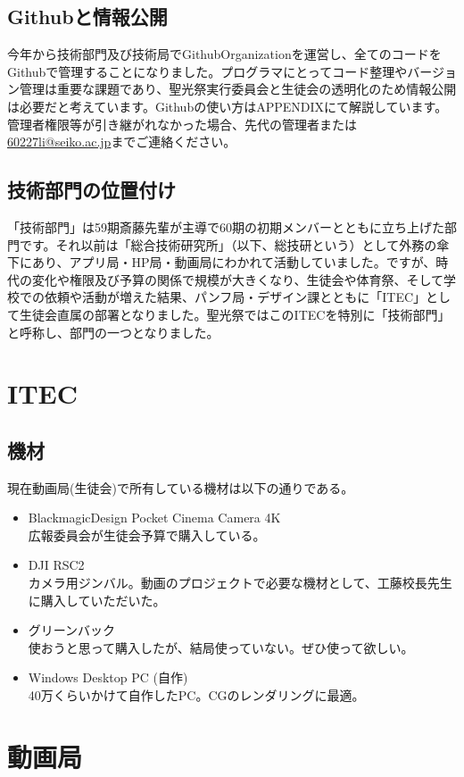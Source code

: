 \documentclass[dvipdfmx,jb5]{jarticle}
\begin{document}
\subsection{Githubと情報公開}
今年から技術部門及び技術局でGithubOrganizationを運営し、全てのコードをGithubで管理することになりました。プログラマにとってコード整理やバージョン管理は重要な課題であり、聖光祭実行委員会と生徒会の透明化のため情報公開は必要だと考えています。Githubの使い方はAPPENDIXにて解説しています。管理者権限等が引き継がれなかった場合、先代の管理者または \url{60227li@seiko.ac.jp}までご連絡ください。
\subsection{技術部門の位置付け}
「技術部門」は59期斎藤先輩が主導で60期の初期メンバーとともに立ち上げた部門です。それ以前は「総合技術研究所」（以下、総技研という）として外務の傘下にあり、アプリ局・HP局・動画局にわかれて活動していました。ですが、時代の変化や権限及び予算の関係で規模が大きくなり、生徒会や体育祭、そして学校での依頼や活動が増えた結果、パンフ局・デザイン課とともに「ITEC」として生徒会直属の部署となりました。聖光祭ではこのITECを特別に「技術部門」と呼称し、部門の一つとなりました。
\section{ITEC}
 \subsection{機材}
 現在動画局(生徒会)で所有している機材は以下の通りである。
 \begin{itemize}
  \item BlackmagicDesign Pocket Cinema Camera 4K\\
  広報委員会が生徒会予算で購入している。
  \item DJI RSC2\\
  カメラ用ジンバル。動画のプロジェクトで必要な機材として、工藤校長先生に購入していただいた。
  \item グリーンバック\\
  使おうと思って購入したが、結局使っていない。ぜひ使って欲しい。
  \item Windows Desktop PC (自作)\\
 40万くらいかけて自作したPC。CGのレンダリングに最適。
 \end{itemize}
\section{動画局}
\end{document}
